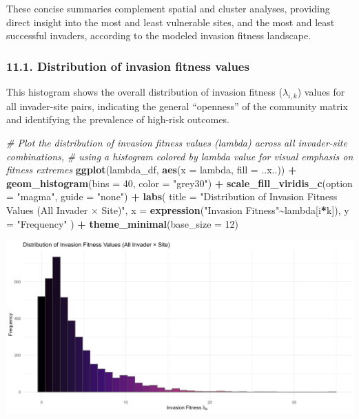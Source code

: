 \documentclass[
]{article}
\newenvironment{Shaded}{\begin{snugshade}}{\end{snugshade}}
\newcommand{\AttributeTok}[1]{\textcolor[rgb]{0.13,0.29,0.53}{#1}}
\newcommand{\CommentTok}[1]{\textcolor[rgb]{0.56,0.35,0.01}{\textit{#1}}}
\newcommand{\DecValTok}[1]{\textcolor[rgb]{0.00,0.00,0.81}{#1}}
\newcommand{\FunctionTok}[1]{\textcolor[rgb]{0.13,0.29,0.53}{\textbf{#1}}}
\newcommand{\NormalTok}[1]{#1}
\newcommand{\SpecialCharTok}[1]{\textcolor[rgb]{0.81,0.36,0.00}{\textbf{#1}}}
\newcommand{\StringTok}[1]{\textcolor[rgb]{0.31,0.60,0.02}{#1}}
\begin{document}
These concise summaries complement spatial and cluster analyses,
providing direct insight into the most and least vulnerable sites, and
the most and least successful invaders, according to the modeled
invasion fitness landscape.

\hypertarget{distribution-of-invasion-fitness-values}{%
\subsubsection{11.1. Distribution of invasion fitness
values}\label{distribution-of-invasion-fitness-values}}

This histogram shows the overall distribution of invasion fitness
(\(\lambda_{i,k}\)) values for all invader-site pairs, indicating the
general ``openness'' of the community matrix and identifying the
prevalence of high-risk outcomes.

\begin{Shaded}
\begin{Highlighting}[]
\CommentTok{\# Plot the distribution of invasion fitness values (lambda) across all invader{-}site combinations,}
\CommentTok{\# using a histogram colored by lambda value for visual emphasis on fitness extremes}
\FunctionTok{ggplot}\NormalTok{(lambda\_df, }\FunctionTok{aes}\NormalTok{(}\AttributeTok{x =}\NormalTok{ lambda, }\AttributeTok{fill =}\NormalTok{ ..x..)) }\SpecialCharTok{+}
  \FunctionTok{geom\_histogram}\NormalTok{(}\AttributeTok{bins =} \DecValTok{40}\NormalTok{, }\AttributeTok{color =} \StringTok{"grey30"}\NormalTok{) }\SpecialCharTok{+}
  \FunctionTok{scale\_fill\_viridis\_c}\NormalTok{(}\AttributeTok{option =} \StringTok{"magma"}\NormalTok{, }\AttributeTok{guide =} \StringTok{"none"}\NormalTok{) }\SpecialCharTok{+}
  \FunctionTok{labs}\NormalTok{(}
    \AttributeTok{title =} \StringTok{"Distribution of Invasion Fitness Values (All Invader × Site)"}\NormalTok{,}
    \AttributeTok{x =} \FunctionTok{expression}\NormalTok{(}\StringTok{"Invasion Fitness"}\SpecialCharTok{\textasciitilde{}}\NormalTok{lambda[i}\SpecialCharTok{*}\NormalTok{k]),}
    \AttributeTok{y =} \StringTok{"Frequency"}
\NormalTok{  ) }\SpecialCharTok{+}
  \FunctionTok{theme\_minimal}\NormalTok{(}\AttributeTok{base\_size =} \DecValTok{12}\NormalTok{)}
\end{Highlighting}
\end{Shaded}

\includegraphics[width=1\linewidth]{man/figures/README-fitness-dist-1}
\end{document}

